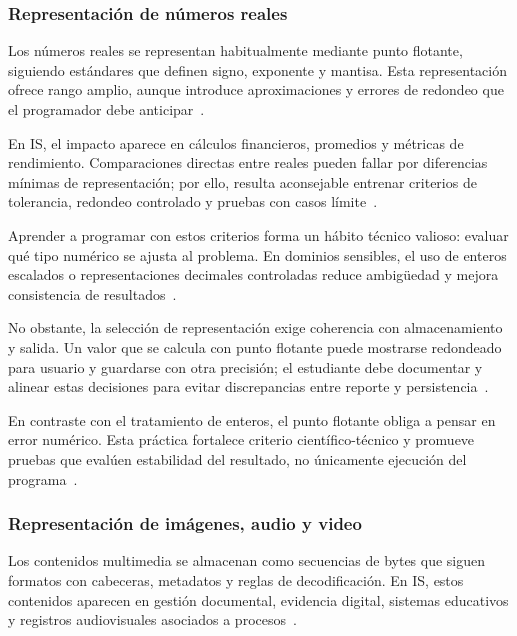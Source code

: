 \documentclass[12pt,twoside]{book}
\begin{document}
					\subsubsection{Representación de números reales}
						\noindent
						Los números reales se representan habitualmente mediante punto flotante, siguiendo estándares que definen signo, exponente y mantisa. Esta representación ofrece rango amplio, aunque introduce aproximaciones y errores de redondeo que el programador debe anticipar~\cite{IEEE2019Standard754,Goldberg1991What,Tanenbaum2021Structured}.
						
						En IS, el impacto aparece en cálculos financieros, promedios y métricas de rendimiento. Comparaciones directas entre reales pueden fallar por diferencias mínimas de representación; por ello, resulta aconsejable entrenar criterios de tolerancia, redondeo controlado y pruebas con casos límite~\cite{Goldberg1991What,IEEE2019Standard754,Chapra2014Numerical}.
						
						Aprender a programar con estos criterios forma un hábito técnico valioso: evaluar qué tipo numérico se ajusta al problema. En dominios sensibles, el uso de enteros escalados o representaciones decimales controladas reduce ambigüedad y mejora consistencia de resultados~\cite{Chapra2014Numerical,Hanly2015Problem,Pressman2019Software}.
						
						No obstante, la selección de representación exige coherencia con almacenamiento y salida. Un valor que se calcula con punto flotante puede mostrarse redondeado para usuario y guardarse con otra precisión; el estudiante debe documentar y alinear estas decisiones para evitar discrepancias entre reporte y persistencia~\cite{Laudon2020Management,Date2019Database,Elmasri2016Database}.
						
						En contraste con el tratamiento de enteros, el punto flotante obliga a pensar en error numérico. Esta práctica fortalece criterio científico-técnico y promueve pruebas que evalúen estabilidad del resultado, no únicamente ejecución del programa~\cite{Goldberg1991What,IEEE2019Standard754,Ghezzi2003Fundamentals}.
						
					\subsubsection{Representación de imágenes, audio y video}
						\noindent
						Los contenidos multimedia se almacenan como secuencias de bytes que siguen formatos con cabeceras, metadatos y reglas de decodificación. En IS, estos contenidos aparecen en gestión documental, evidencia digital, sistemas educativos y registros audiovisuales asociados a procesos~\cite{Laudon2020Management,Tanenbaum2021Structured,Silberschatz2018Operating}.
						
\end{document}
